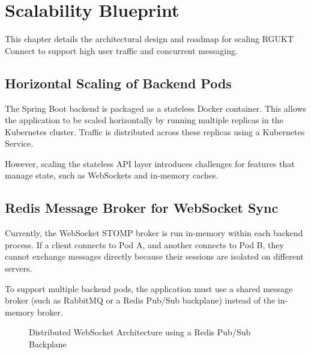 \chapter{Scalability Blueprint}
\label{ch:scalability}

This chapter details the architectural design and roadmap for scaling RGUKT Connect to support high user traffic and concurrent messaging.

\section{Horizontal Scaling of Backend Pods}
The Spring Boot backend is packaged as a stateless Docker container. This allows the application to be scaled horizontally by running multiple replicas in the Kubernetes cluster. Traffic is distributed across these replicas using a Kubernetes Service.

However, scaling the stateless API layer introduces challenges for features that manage state, such as WebSockets and in-memory caches.

\section{Redis Message Broker for WebSocket Sync}
Currently, the WebSocket STOMP broker is run in-memory within each backend process. If a client connects to Pod A, and another connects to Pod B, they cannot exchange messages directly because their sessions are isolated on different servers.

To support multiple backend pods, the application must use a shared message broker (such as RabbitMQ or a Redis Pub/Sub backplane) instead of the in-memory broker.

\begin{figure}[H]
    \centering
    \caption{Distributed WebSocket Architecture using a Redis Pub/Sub Backplane}
    \label{fig:redis_pubsub}
\end{figure}

